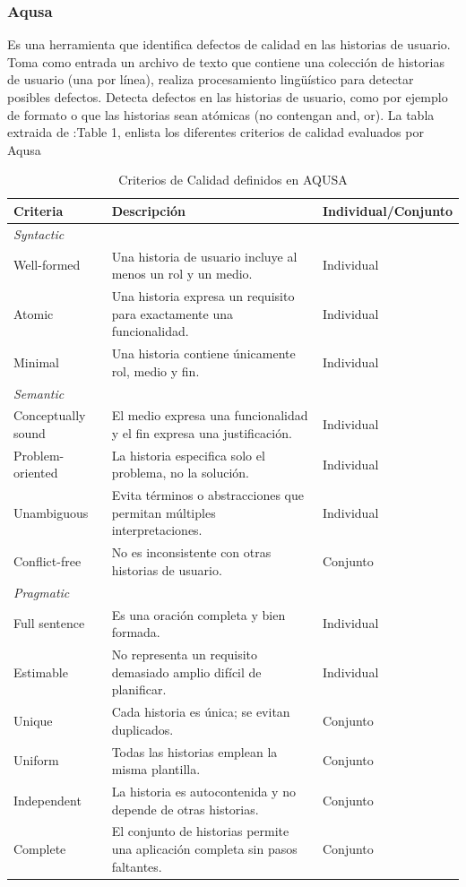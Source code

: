 \subsubsection{Aqusa}
Es una herramienta \cite{aqusa} que identifica defectos de calidad en las historias de usuario. Toma como entrada un archivo de texto que contiene una colección de historias de usuario (una por línea), realiza procesamiento lingüístico para detectar posibles defectos. Detecta defectos en las historias de usuario, como por ejemplo de formato o que las historias sean atómicas (no contengan and, or). La tabla extraida de \cite{aqusa-paper}:Table 1, enlista los diferentes criterios de calidad evaluados por Aqusa

\begin{table}[htb]
\centering
\begin{tabular}{|l|p{7cm}|l|}
\hline
\textbf{Criteria} & \textbf{Descripción} & \textbf{Individual/Conjunto} \\
\hline

\multicolumn{3}{|l|}{\textit{Syntactic}} \\ \hline
Well-formed & Una historia de usuario incluye al menos un rol y un medio. & Individual \\ \hline
Atomic & Una historia expresa un requisito para exactamente una funcionalidad. & Individual \\ \hline
Minimal & Una historia contiene únicamente rol, medio y fin. & Individual \\ \hline

\multicolumn{3}{|l|}{\textit{Semantic}} \\ \hline
Conceptually sound & El medio expresa una funcionalidad y el fin expresa una justificación. & Individual \\ \hline
Problem-oriented & La historia especifica solo el problema, no la solución. & Individual \\ \hline
Unambiguous & Evita términos o abstracciones que permitan múltiples interpretaciones. & Individual \\ \hline
Conflict-free & No es inconsistente con otras historias de usuario. & Conjunto \\ \hline

\multicolumn{3}{|l|}{\textit{Pragmatic}} \\ \hline
Full sentence & Es una oración completa y bien formada. & Individual \\ \hline
Estimable & No representa un requisito demasiado amplio difícil de planificar. & Individual \\ \hline
Unique & Cada historia es única; se evitan duplicados. & Conjunto \\ \hline
Uniform & Todas las historias emplean la misma plantilla. & Conjunto \\ \hline
Independent & La historia es autocontenida y no depende de otras historias. & Conjunto \\ \hline
Complete & El conjunto de historias permite una aplicación completa sin pasos faltantes. & Conjunto \\ \hline

\end{tabular}
\caption{Criterios de Calidad definidos en AQUSA}
\end{table}


